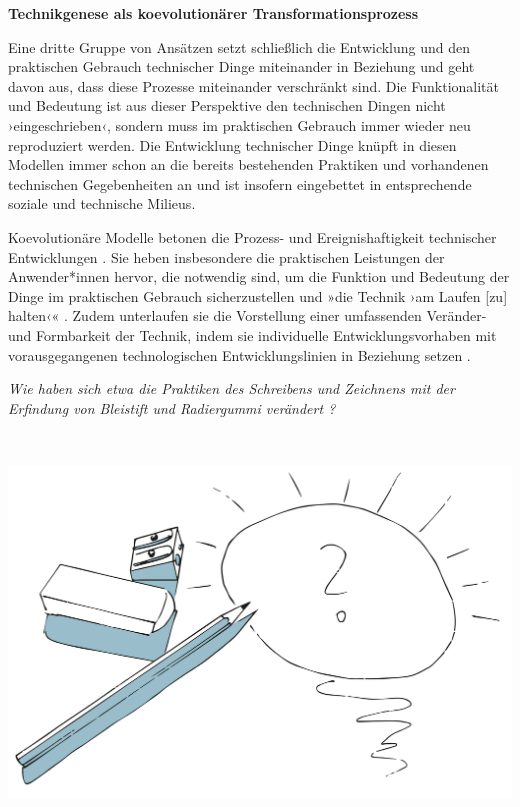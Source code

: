 \documentclass[
  a4paper,
]{book}
\begin{document}
\textbf{Technikgenese als koevolutionärer Transformationsprozess}

Eine dritte Gruppe von Ansätzen setzt schließlich die Entwicklung und den praktischen Gebrauch technischer Dinge miteinander in Beziehung und geht davon aus, dass diese Prozesse miteinander verschränkt sind. Die Funktionalität und Bedeutung ist aus dieser Perspektive den technischen Dingen nicht ›eingeschrieben‹, sondern muss im praktischen Gebrauch immer wieder neu reproduziert werden. Die Entwicklung technischer Dinge knüpft in diesen Modellen immer schon an die bereits bestehenden Praktiken und vorhandenen technischen Gegebenheiten an und ist insofern eingebettet in entsprechende soziale und technische Milieus.

Koevolutionäre Modelle betonen die Prozess- und Ereignishaftigkeit technischer Entwicklungen \citep{mackenzieProblematisingTechnologicalObject2005}. Sie heben insbesondere die praktischen Leistungen der Anwender*innen hervor, die notwendig sind, um die Funktion und Bedeutung der Dinge im praktischen Gebrauch sicherzustellen und »die Technik ›am Laufen {[}zu{]} halten‹« \citep{horningExpertenAlltags2001}. Zudem unterlaufen sie die Vorstellung einer umfassenden Veränder- und Formbarkeit der Technik, indem sie individuelle Entwicklungsvorhaben mit vorausgegangenen technologischen Entwicklungslinien in Beziehung setzen \citep[z.B.][]{lawsonOntologyTechnologyArtefacts2008, riederEnginesOrderMechanology2020}.

\begin{blackbox}
\emph{Wie haben sich etwa die Praktiken des Schreibens und Zeichnens mit der Erfindung von Bleistift und Radiergummi verändert \citep[siehe hierzu ausführlicher etwa][]{oelkersHistorizitatPadagogischerGegenstande2012}?}

\end{blackbox}

~

\begin{center}\includegraphics{Figures/06-02-Pencil} \end{center}
\end{document}
